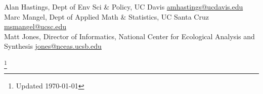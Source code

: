 \documentclass[margin]{res}
\begin{document}
\begin{resume}
Alan Hastings, Dept of Env Sci \& Policy, UC Davis \href{mailto:amhastings@ucdavis.edu}{amhastings@ucdavis.edu} \\ 
Marc Mangel, Dept of Applied Math \& Statistics, UC Santa Cruz \href{mailto:msmangel@ucsc.edu}{msmangel@ucsc.edu} \\
Matt Jones, Director of Informatics, National Center for Ecological Analysis and Synthesis \href{mailto:jones@nceas.ucsv.edu}{jones@nceas.ucsb.edu} \\






\end{resume}
\let\thefootnote\relax\footnote{Updated \today}
\end{document}
